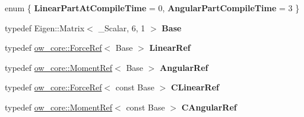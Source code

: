 \begin{DoxyCompactItemize}
\item 
enum \{ {\bfseries Linear\+Part\+At\+Compile\+Time} = 0, 
{\bfseries Angular\+Part\+Compile\+Time} = 3
 \}\hypertarget{structow_1_1traits_3_01ow__core_1_1Wrench_3_01__Scalar_01_4_01_4_a42579a18da4b68005dfcd475635ca38e}{}\label{structow_1_1traits_3_01ow__core_1_1Wrench_3_01__Scalar_01_4_01_4_a42579a18da4b68005dfcd475635ca38e}

\item 
typedef Eigen\+::\+Matrix$<$ \+\_\+\+Scalar, 6, 1 $>$ {\bfseries Base}\hypertarget{structow_1_1traits_3_01ow__core_1_1Wrench_3_01__Scalar_01_4_01_4_aa924779665441099108c75ac304b0472}{}\label{structow_1_1traits_3_01ow__core_1_1Wrench_3_01__Scalar_01_4_01_4_aa924779665441099108c75ac304b0472}

\item 
typedef \hyperlink{classow__core_1_1ForceRef}{ow\+\_\+core\+::\+Force\+Ref}$<$ Base $>$ {\bfseries Linear\+Ref}\hypertarget{structow_1_1traits_3_01ow__core_1_1Wrench_3_01__Scalar_01_4_01_4_ae53a662a9658e9b78d6dd897464e799f}{}\label{structow_1_1traits_3_01ow__core_1_1Wrench_3_01__Scalar_01_4_01_4_ae53a662a9658e9b78d6dd897464e799f}

\item 
typedef \hyperlink{classow__core_1_1MomentRef}{ow\+\_\+core\+::\+Moment\+Ref}$<$ Base $>$ {\bfseries Angular\+Ref}\hypertarget{structow_1_1traits_3_01ow__core_1_1Wrench_3_01__Scalar_01_4_01_4_a860fc23ec8440b93bb58ad475e11046e}{}\label{structow_1_1traits_3_01ow__core_1_1Wrench_3_01__Scalar_01_4_01_4_a860fc23ec8440b93bb58ad475e11046e}

\item 
typedef \hyperlink{classow__core_1_1ForceRef}{ow\+\_\+core\+::\+Force\+Ref}$<$ const Base $>$ {\bfseries C\+Linear\+Ref}\hypertarget{structow_1_1traits_3_01ow__core_1_1Wrench_3_01__Scalar_01_4_01_4_a9d5d3ee98836431f3f06763130905acd}{}\label{structow_1_1traits_3_01ow__core_1_1Wrench_3_01__Scalar_01_4_01_4_a9d5d3ee98836431f3f06763130905acd}

\item 
typedef \hyperlink{classow__core_1_1MomentRef}{ow\+\_\+core\+::\+Moment\+Ref}$<$ const Base $>$ {\bfseries C\+Angular\+Ref}\hypertarget{structow_1_1traits_3_01ow__core_1_1Wrench_3_01__Scalar_01_4_01_4_a2a4445142c71d96a530d1c6a52568f24}{}\label{structow_1_1traits_3_01ow__core_1_1Wrench_3_01__Scalar_01_4_01_4_a2a4445142c71d96a530d1c6a52568f24}

\end{DoxyCompactItemize}



